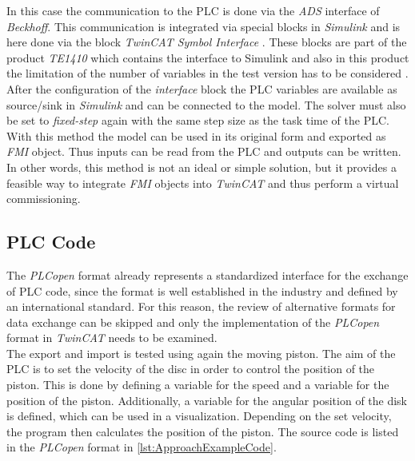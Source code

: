     In this case the communication to the PLC is done via the \textit{ADS} interface of \textit{Beckhoff}. This communication is integrated via special blocks in \textit{Simulink} and is here done via the block \textit{TwinCAT Symbol Interface} \cite{TwincatAdsBlocks}. These blocks are part of the product \textit{TE1410} which contains the interface to Simulink and also in this product the limitation of the number of variables in the test version has to be considered \cite{TwincatManualTE1410}. \\
    After the configuration of the \textit{interface} block the PLC variables are available as source/sink in \textit{Simulink} and can be connected to the model. The solver must also be set to \textit{fixed-step} again with the same step size as the task time of the PLC. \\
    With this method the model can be used in its original form and exported as \textit{FMI} object. Thus inputs can be read from the PLC and outputs can be written. In other words, this method is not an ideal or simple solution, but it provides a feasible way to integrate \textit{FMI} objects into \textit{TwinCAT} and thus perform a virtual commissioning.  

\subsection{PLC Code}
    The \textit{PLCopen} format already represents a standardized interface for the exchange of PLC code, since the format is well established in the industry and defined by an international standard. For this reason, the review of alternative formats for data exchange can be skipped and only the implementation of the \textit{PLCopen} format in \textit{TwinCAT} needs to be examined.  \\
    
    The export and import is tested using again the moving piston. The aim of the PLC is to set the velocity of the disc in order to control the position of the piston. This is done by defining a variable for the speed and a variable for the position of the piston. Additionally, a variable for the angular position of the disk is defined, which can be used in a visualization. Depending on the set velocity, the program then calculates the position of the piston. The source code is listed in the \textit{PLCopen} format in \autoref{lst:ApproachExampleCode}. 
    
    
